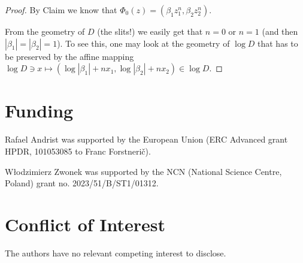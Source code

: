 \documentclass[a4paper,12pt]{amsart}
\theoremstyle{definition}
\begin{document}
\begin{proof}

By Claim we know that $\Phi_0(z)=(\beta_1z_1^n,\beta_2z_2^n)$. 

 From the geometry of $D$ (the slits!) we easily get that $n=0$ or $n=1$ (and then $|\beta_1|=|\beta_2|=1$). To see this, one may look at the geometry of $\log D$
 that has to be preserved by the affine mapping $\log D\owns x \mapsto (\log|\beta_1|+n x_1,\log|\beta_2|+nx_2)\in\log D$.
\end{proof}

\section*{Funding}
Rafael Andrist was supported by the European Union (ERC Advanced
grant HPDR, 101053085 to Franc Forstneri\v{c}). 

W\l odzimierz Zwonek was supported by the NCN (National Science Centre, Poland) grant no. 2023/51/B/ST1/01312.

\section*{Conflict of Interest}
The authors have no relevant competing interest to disclose.
\end{document}
